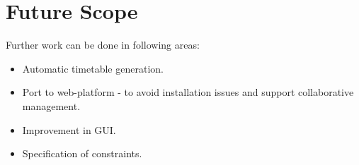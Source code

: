 %

\chapter{Future Scope}
Further work can be done in following areas:
\begin{itemize}
\item Automatic timetable generation.
\item Port to web-platform - to avoid installation issues and support collaborative management. 
\item Improvement in GUI.
\item Specification of constraints.
\end{itemize}
			


 
 
